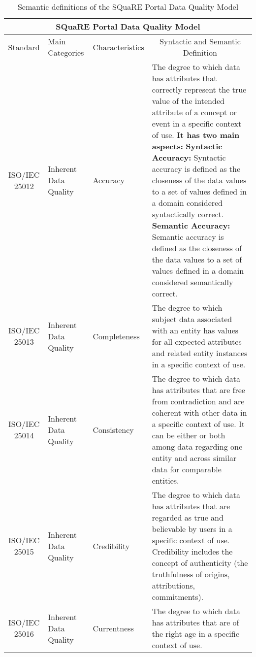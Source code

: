 \documentclass[a4paper, twoside]{report}
\begin{document}
\begin{table}[htbp]
  \centering
\caption{Semantic definitions of the SQuaRE Portal Data Quality Model}
   \tabcolsep=0.60cm
	\renewcommand{\arraystretch}{1.8}
	\begin{adjustbox}{max width=\linewidth}
    \begin{tabular}{cp{16em}p{10.165em}p{57.335em}}
    \hline
  \multicolumn{4}{c}{SQuaRE Portal Data Quality Model} \\
  \hline
   {Standard} & {Main Categories} & {Characteristics} & \multicolumn{1}{c}{Syntactic and Semantic Definition} \\
    \midrule
    ISO/IEC 25012 & Inherent Data Quality & Accuracy & The degree to which data has attributes that correctly represent the true value of the intended attribute of a concept or event in a specific context of use. \textbf{It has two main aspects:}\newline{}\newline{} \textbf{Syntactic Accuracy:} Syntactic accuracy is defined as the closeness of the data values to a set of values defined in a domain considered syntactically correct.\newline{} \textbf{Semantic Accuracy:} Semantic accuracy is defined as the closeness of the data values to a set of values defined in a domain considered semantically correct. \\
    \midrule
    ISO/IEC 25013 & Inherent Data Quality & Completeness & The degree to which subject data associated with an entity has values for all expected attributes and related entity instances in a specific context of use. \\
    \midrule
    ISO/IEC 25014 & Inherent Data Quality & Consistency & The degree to which data has attributes that are free from contradiction and are coherent with other data in a specific context of use. It can be either or both among data regarding one entity and across similar data for comparable entities. \\
    \midrule
    ISO/IEC 25015 & Inherent Data Quality & Credibility & The degree to which data has attributes that are regarded as true and believable by users in a specific context of use. Credibility includes the concept of authenticity (the truthfulness of origins, attributions, commitments). \\
    \midrule
    ISO/IEC 25016 & Inherent Data Quality & Currentness & The degree to which data has attributes that are of the right age in a specific context of use. \\

\end{tabular}
\end{adjustbox}
\end{table}
\end{document}
